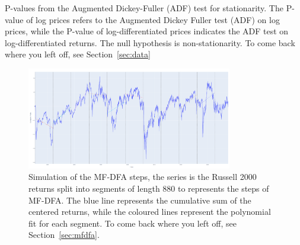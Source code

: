 \documentclass[11pt]{extarticle}
\begin{document}
\begin{table}[h!]
    \centering
    \caption{P-values from the Augmented Dickey-Fuller (ADF) test for stationarity. The P-value of log prices refers to the Augmented Dickey Fuller test (ADF) on log prices,
     while the P-value of log-differentiated prices indicates the ADF test on log-differentiated returns. The null hypothesis is non-stationarity.
    To come back where you left off, see Section~\ref{sec:data}}
    \label{table:adf_results}
\end{table}


\begin{figure}[ht]
    \centering
    \includegraphics[width=0.8\textwidth]{img/cumulative_profile_segment_partitioning}
    \caption{Simulation of the MF-DFA steps, the series is the Russell 2000 returns
    split into segments of length 880 to represents the steps of MF-DFA.
        The blue line represents the cumulative sum of the centered returns, while the coloured lines represent the polynomial fit for
    each segment. To come back where you left off, see Section~\ref{sec:mfdfa}.}
    \label{fig:cumulative_profile_segment_partitioning}
\end{figure}
\FloatBarrier
\end{document}
